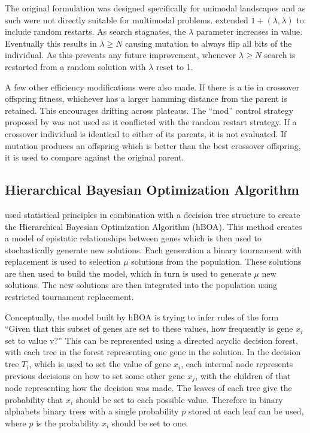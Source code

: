 \documentclass[twoside]{article}
\begin{document}
The original formulation was designed specifically for unimodal landscapes and as such were
not directly suitable for multimodal problems. \cite{goldman:2014:p3} extended $1+(\lambda, \lambda)$
to include random restarts. As search stagnates, the $\lambda$ parameter increases in value. Eventually
this results in $\lambda \ge N$ causing mutation to always flip all bits of the individual.
As this prevents any future improvement, whenever $\lambda \ge N$ search is restarted from a random solution with $\lambda$
reset to 1.

A few other efficiency modifications were also made. If there is a tie in crossover offspring fitness,
whichever has a larger hamming distance from the parent is retained. This encourages drifting across plateaus.
The ``mod'' control strategy proposed by \cite{doerr:2013:lambdalambda} was not used as it conflicted with
the random restart strategy.
If a crossover individual is identical to either of its parents, it is not evaluated.
If mutation produces an offspring which is better than the best crossover offspring, it is used to compare
against the original parent.


\subsection{Hierarchical Bayesian Optimization Algorithm}

\cite{pelikan:2006:hboa} used statistical principles in combination with a decision tree structure
to create the Hierarchical Bayesian Optimization Algorithm (hBOA). This method creates a model of
epistatic relationships between genes which is then used to stochastically generate new solutions.
Each generation a binary tournament with replacement is used to selection $\mu$ solutions from
the population. These solutions are then used to build the model, which in turn is used to generate $\mu$ new
solutions. The new solutions are then integrated into the population using restricted tournament
replacement.

Conceptually, the model built by hBOA is trying to infer rules of the form ``Given that this
subset of genes are set to these values, how frequently is gene $x_i$ set to value v?'' This can
be represented using a directed acyclic decision forest, with each tree in the forest representing one gene
in the solution. In the decision tree $T_i$, which is used to set the value of gene $x_i$,
each internal node represents previous decisions on how to set
some other gene $x_j$, with the children of that node representing how the decision was made. The
leaves of each tree give the probability that $x_i$ should be set to each possible value.
Therefore in binary alphabets binary trees with a single probability $p$ stored at each leaf
can be used, where $p$ is the probability $x_i$ should be set to one.
\end{document}
